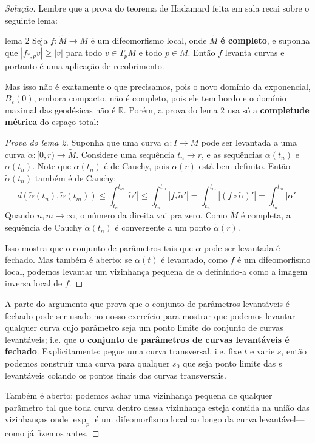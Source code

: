 \begin{proof}[Solução]
Lembre que a prova do teorema de Hadamard feita em sala recai sobre o seguinte lema:
\begin{thing7}{lema 2}\leavevmode
Seja \(f:\tilde{M} \to M\) é um difeomorfismo local, onde \(\tilde{M}\) \textbf{é completo}, e suponha que \(|f_{*,p} v|\geq |v|\) para todo \(v \in T_pM\) e todo \(p \in M\). Então \(f\) levanta curvas e portanto é uma aplicação de recobrimento.
\end{thing7}
Mas isso não é exatamente o que precisamos, pois o novo domínio da exponencial, \(B_\varepsilon(0)\), embora compacto, não é completo, pois ele tem bordo e o domínio maximal das geodésicas não é \(\mathbb{R}\). Porém, a prova do lema 2 usa só a \textbf{completude métrica} do espaço total:
\begin{proof}[Prova do lema 2]\leavevmode
Suponha que uma curva \(\alpha:I \to M\) pode ser levantada a uma curva \(\tilde{\alpha}:[0,r) \to \tilde{M}\). Considere uma sequência \(t_n \to r\), e as sequências \(\alpha(t_n)\) e \(\tilde{\alpha}(t_n)\). Note que \(\alpha(t_n)\) é de Cauchy, pois \(\alpha(r)\) está bem definito. Então \(\tilde{\alpha}(t_n)\) também é de Cauchy:
\[d(\tilde{\alpha}(t_n),\tilde{\alpha}(t_m))\leq \int_{t_n}^{t_m} |\tilde{\alpha}'|\leq \int_{t_n}^{t_m}|f_*\tilde{\alpha}'|=\int_{t_n}^{t_m}|(f \circ\tilde{\alpha})'|=\int_{t_n}^{t_m}|\alpha'|\]
Quando \(n,m \to \infty\), o número da direita vai pra zero. Como \(\tilde{M}\) é completa, a sequência de Cauchy \(\tilde{\alpha}(t_n)\) é convergente a um ponto \(\tilde{\alpha}(r)\).

Isso mostra que o conjunto de parâmetros tais que \(\alpha\) pode ser levantada é fechado. Mas também é aberto: se \(\alpha(t)\) é levantado, como \(f\) é um difeomorfismo local, podemos levantar um vizinhança pequena de \(\alpha\) definindo-a como a imagem inversa local de \(f\).
\end{proof}
A parte do argumento que prova que o conjunto de parâmetros levantáveis é fechado pode ser usado no nosso exercício para mostrar que podemos levantar qualquer curva cujo parâmetro seja um ponto limite do conjunto de curvas levantáveis; i.e. que \textbf{o conjunto de parâmetros de curvas levantáveis é fechado}. Explicitamente: pegue uma curva transversal, i.e. fixe \(t\) e varie \(s\), então podemos construir uma curva para qualquer $s_0$ que seja ponto limite das s levantáveis colando os pontos finais das curvas transversais.

Também é aberto: podemos achar uma vizinhança pequena de qualquer parâmetro tal que toda curva dentro dessa vizinhança esteja contida na união das vizinhanças onde \(\operatorname{exp}_p\) é um difeomorfismo local ao longo da curva levantável---como já fizemos antes.


\end{proof}
